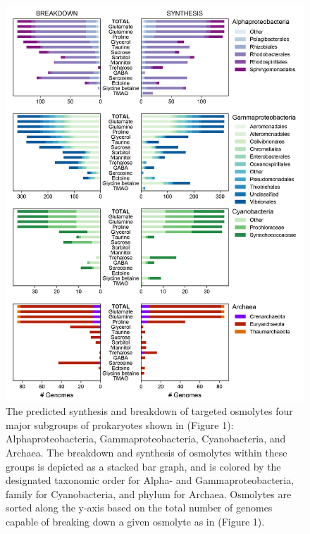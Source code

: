 \documentclass[utf8]{frontiers_suppmat} %
\begin{document}
\begin{figure}[ht]
    \centering
    \includegraphics[width=0.9\columnwidth]{Figures/SI-Groups-Syn_BD-01.png}
    \caption{The predicted synthesis and breakdown of targeted osmolytes four major subgroups of prokaryotes shown in (Figure 1): Alphaproteobacteria, Gammaproteobacteria, Cyanobacteria, and Archaea. The breakdown and synthesis of osmolytes within these groups is depicted as a stacked bar graph, and is colored by the designated taxonomic order for Alpha- and Gammaproteobacteria, family for Cyanobacteria, and phylum for Archaea. Osmolytes are sorted along the y-axis based on the total number of genomes capable of breaking down a given osmolyte as in (Figure 1).}
    \label{fig:groups}
\end{figure}
\end{document}
